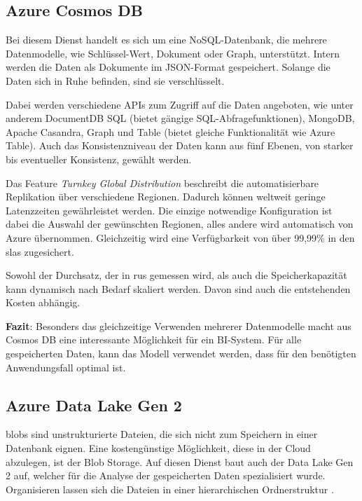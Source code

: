 \subsection{Azure Cosmos DB} \label{sec:grundlagen:azure_dienste:cosmosDB}
Bei diesem Dienst handelt es sich um eine NoSQL-Datenbank, die mehrere Datenmodelle, wie Schlüssel-Wert, Dokument oder Graph, unterstützt. Intern werden die Daten als Dokumente im JSON-Format gespeichert. Solange die Daten sich in Ruhe befinden, sind sie verschlüsselt.

Dabei werden verschiedene APIs zum Zugriff auf die Daten angeboten, wie unter anderem DocumentDB SQL (bietet gängige SQL-Abfragefunktionen), MongoDB, Apache Casandra, Graph und Table (bietet gleiche Funktionalität wie Azure Table). Auch das Konsistenzniveau der Daten kann aus fünf Ebenen, von starker bis eventueller Konsistenz, gewählt werden.

Das Feature \textit{Turnkey Global Distribution} beschreibt die automatisierbare Replikation über verschiedene Regionen. Dadurch können weltweit geringe Latenzzeiten gewährleistet werden. Die einzige notwendige Konfiguration ist dabei die Auswahl der gewünschten Regionen, alles andere wird automatisch von Azure übernommen. Gleichzeitig wird eine Verfügbarkeit von über 99,99\% in den \acp{sla} zugesichert.

Sowohl der Durchsatz, der in \acp{ru} gemessen wird, als auch die Speicherkapazität kann dynamisch nach Bedarf skaliert werden. Davon sind auch die entstehenden Kosten abhängig.
\cite{guay_paz_microsoft_2018}\cite{mrzyglod_hands-azure_2018}

\textbf{Fazit}: Besonders das gleichzeitige Verwenden mehrerer Datenmodelle macht aus Cosmos DB eine interessante Möglichkeit für ein BI-System. Für alle gespeicherten Daten, kann das Modell verwendet werden, dass für den benötigten Anwendungsfall optimal ist.

\subsection{Azure Data Lake Gen 2} \label{sec:grundlagen:azure_dienste:dataLake}
\acp{blob} sind unstrukturierte Dateien, die sich nicht zum Speichern in einer Datenbank eignen. Eine kostengünstige Möglichkeit, diese in der Cloud abzulegen, ist der Blob Storage. Auf diesen Dienst baut auch der Data Lake Gen 2 auf, welcher für die Analyse der gespeicherten Daten spezialisiert wurde. Organisieren lassen sich die Dateien in einer hierarchischen Ordnerstruktur \cite{soh_microsoft_2020}.

